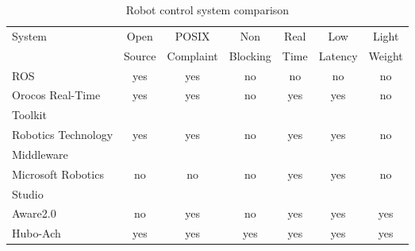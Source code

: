 \begin{table}\label{table:robotOS}
\caption{Robot control system comparison}
\begin{tabular}{l || c | c | c | c | c | c}
\hline
System                          & Open        & POSIX           & Non          & Real      & Low         & Light \\
                                &      Source &       Complaint &     Blocking &      Time &     Latency & Weight\\
\hline
\hline
ROS                             & yes         & yes             & no           & no        & no          & no \\
\hline
Orocos Real-Time                & yes         & yes             & no           & yes       & yes         & no \\
                 Toolkit        &             &                 &              &           &             &    \\
\hline

Robotics Technology             & yes         & yes             & no           & yes       & yes         & no \\
                    Middleware  &             &                 &              &           &             &    \\
\hline
Microsoft Robotics              & no          & no              & no           & yes       & yes         & no \\
                   Studio       &             &                 &              &           &             &    \\
\hline
Aware2.0                        & no          & yes             & no           & yes       & yes         & yes \\
\hline
Hubo-Ach                        & yes         & yes             & yes          & yes       & yes         & yes \\



\hline
\end{tabular}
\end{table}
